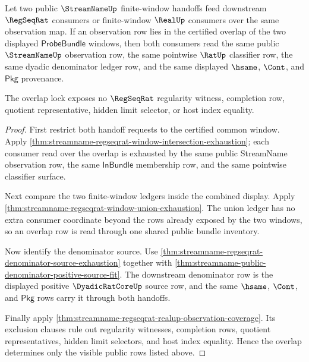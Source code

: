 \begin{theorem}
\label{thm:streamname-regseqrat-public-overlap-lock}
Let two public $\StreamNameUp$ finite-window handoffs feed downstream
$\RegSeqRat$ consumers or finite-window $\RealUp$ consumers over the same
observation map. If an observation row lies in the certified overlap of the two
displayed $\mathsf{ProbeBundle}$ windows, then both consumers read the same
public $\StreamNameUp$ observation row, the same pointwise $\RatUp$ classifier
row, the same dyadic denominator ledger row, and the same displayed $\hsame$,
$\Cont$, and $\mathsf{Pkg}$ provenance.

The overlap lock exposes no $\RegSeqRat$ regularity witness, completion row,
quotient representative, hidden limit selector, or host index equality.
\end{theorem}
\begin{proof}
First restrict both handoff requests to the certified common window. Apply
\autoref{thm:streamname-regseqrat-window-intersection-exhaustion}; each
consumer read over the overlap is exhausted by the same public StreamName
observation row, the same $\mathsf{InBundle}$ membership row, and the same
pointwise classifier surface.

Next compare the two finite-window ledgers inside the combined display. Apply
\autoref{thm:streamname-regseqrat-window-union-exhaustion}. The union ledger
has no extra consumer coordinate beyond the rows already exposed by the two
windows, so an overlap row is read through one shared public bundle inventory.

Now identify the denominator source. Use
\autoref{thm:streamname-regseqrat-denominator-source-exhaustion} together with
\autoref{thm:streamname-public-denominator-positive-source-fit}. The downstream
denominator row is the displayed positive $\DyadicRatCoreUp$ source row, and
the same $\hsame$, $\Cont$, and $\mathsf{Pkg}$ rows carry it through both
handoffs.

Finally apply
\autoref{thm:streamname-regseqrat-realup-observation-coverage}. Its exclusion
clauses rule out regularity witnesses, completion rows, quotient
representatives, hidden limit selectors, and host index equality. Hence the
overlap determines only the visible public rows listed above.
\end{proof}


